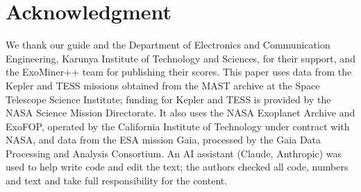 \documentclass[conference,a4paper]{IEEEtran}
\begin{document}
\section*{Acknowledgment}
We thank our guide and the Department of Electronics and Communication Engineering, Karunya Institute of Technology and Sciences, for their support, and the ExoMiner++ team for publishing their scores. This paper uses data from the Kepler and TESS missions obtained from the MAST archive at the Space Telescope Science Institute; funding for Kepler and TESS is provided by the NASA Science Mission Directorate. It also uses the NASA Exoplanet Archive and ExoFOP, operated by the California Institute of Technology under contract with NASA, and data from the ESA mission Gaia, processed by the Gaia Data Processing and Analysis Consortium. An AI assistant (Claude, Anthropic) was used to help write code and edit the text; the authors checked all code, numbers and text and take full responsibility for the content.
\end{document}
